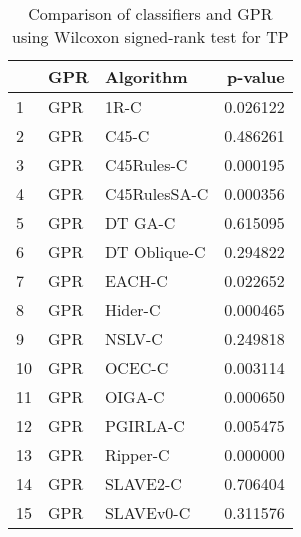\begin{table}
\footnotesize
\caption{Comparison of classifiers and GPR using Wilcoxon signed-rank test for TP}
\label{tab:GPR wilcoxon TP comparison}
\begin{tabular}{lllr}
\hline
 & GPR & Algorithm & p-value \\
\hline
1 & GPR & 1R-C & 0.026122 \\
2 & GPR & C45-C & 0.486261 \\
3 & GPR & C45Rules-C & 0.000195 \\
4 & GPR & C45RulesSA-C & 0.000356 \\
5 & GPR & DT GA-C & 0.615095 \\
6 & GPR & DT Oblique-C & 0.294822 \\
7 & GPR & EACH-C & 0.022652 \\
8 & GPR & Hider-C & 0.000465 \\
9 & GPR & NSLV-C & 0.249818 \\
10 & GPR & OCEC-C & 0.003114 \\
11 & GPR & OIGA-C & 0.000650 \\
12 & GPR & PGIRLA-C & 0.005475 \\
13 & GPR & Ripper-C & 0.000000 \\
14 & GPR & SLAVE2-C & 0.706404 \\
15 & GPR & SLAVEv0-C & 0.311576 \\
\hline
\end{tabular}
\end{table}
